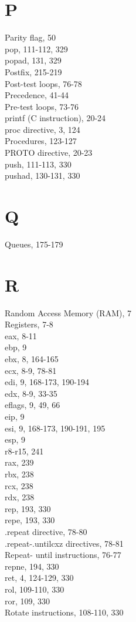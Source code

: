 \documentclass[10pt]{article}
\begin{document}
\section*{P}
Parity flag, 50\\
pop, 111-112, 329\\
popad, 131, 329\\
Postfix, 215-219\\
Post-test loops, 76-78\\
Precedence, 41-44\\
Pre-test loops, 73-76\\
printf (C instruction), 20-24\\
proc directive, 3, 124\\
Procedures, 123-127\\
PROTO directive, 20-23\\
push, 111-113, 330\\
pushad, 130-131, 330

\section*{Q}
Queues, 175-179

\section*{R}
Random Access Memory (RAM), 7\\
Registers, 7-8\\
eax, 8-11\\
ebp, 9\\
ebx, 8, 164-165\\
ecx, 8-9, 78-81\\
edi, 9, 168-173, 190-194\\
edx, 8-9, 33-35\\
eflags, 9, 49, 66\\
eip, 9\\
esi, 9, 168-173, 190-191, 195\\
esp, 9\\
r8-r15, 241\\
rax, 239\\
rbx, 238\\
rcx, 238\\
rdx, 238\\
rep, 193, 330\\
repe, 193, 330\\
.repeat directive, 78-80\\
.repeat-.untilcxz directives, 78-81\\
Repeat- until instructions, 76-77\\
repne, 194, 330\\
ret, 4, 124-129, 330\\
rol, 109-110, 330\\
ror, 109, 330\\
Rotate instructions, 108-110, 330
\end{document}
